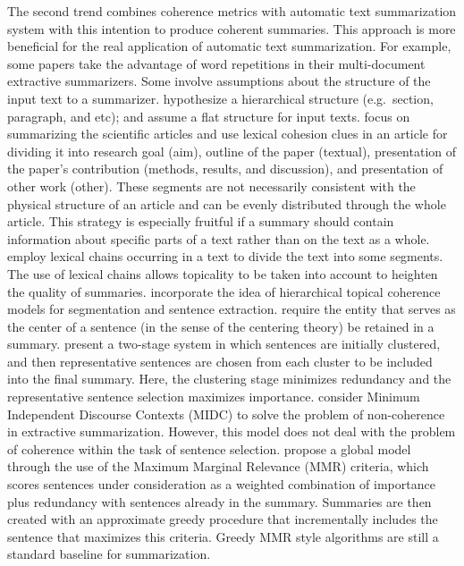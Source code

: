 The second trend combines coherence metrics with automatic text summarization system with this intention to produce coherent summaries.  
This approach is more beneficial for the real application of automatic text summarization. 
For example, some papers \cite{radev04a,nenkova05} take the advantage of word repetitions in their multi-document extractive summarizers. 
Some involve assumptions about the structure of the input text to a summarizer. 
 hypothesize a hierarchical structure (e.g.\ section, paragraph, and etc); and  assume a flat structure for input texts. 
 focus on summarizing the scientific articles and use lexical cohesion clues in an article for dividing it into research goal (aim), outline of the paper (textual), presentation of the paper's contribution (methods, results, and discussion), and presentation of other work (other). 
These segments are not necessarily consistent with the physical structure of an article and can be evenly distributed through the whole article. 
This strategy is especially fruitful if a summary should contain information about specific parts of a text rather than on the text as a whole.  
 employ lexical chains occurring in a text to divide the text into some segments.  
The use of lexical chains allows topicality to be taken into account to heighten the quality of summaries.
 incorporate the idea of hierarchical topical coherence models for segmentation and sentence extraction. 
 require the entity that serves as the center of a sentence (in the sense of the centering theory) be retained in a summary. 
 present a \mbox{two-stage} system in which sentences are initially clustered, and then representative sentences are chosen from each cluster to be included into the final summary. 
Here, the clustering stage minimizes redundancy and the representative sentence selection maximizes importance.
 consider Minimum Independent Discourse Contexts (MIDC) to solve the problem of non-coherence in extractive summarization.
However, this model does not deal with the problem of coherence within the task of sentence selection. 
 propose a global model through the use of the Maximum Marginal Relevance (MMR) criteria, which scores sentences under consideration as a weighted combination of importance plus redundancy with sentences already in the summary. 
Summaries are then created with an approximate greedy procedure that incrementally includes the sentence that maximizes this criteria. Greedy MMR style algorithms are still a standard baseline for summarization. 


